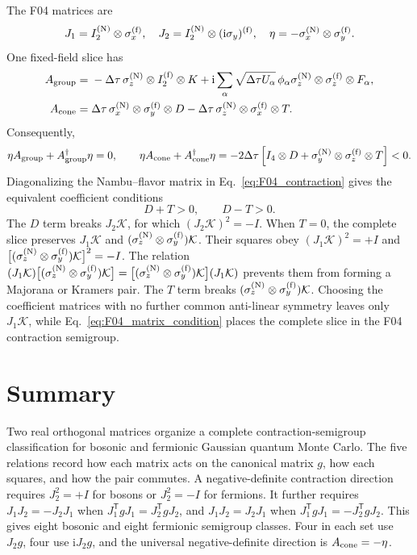 \documentclass[onecolumn,aps,prb,amsmath,amssymb,superscriptaddress,longbibliography,floatfix]{revtex4-2}
\newcommand{\ii}{\mathrm{i}}
\newcommand{\trans}{\mathsf{T}}
\newcommand{\mc}[1]{\mathcal{#1}}
\begin{document}
The F04 matrices are
\begin{equation}
J_1=I_2^{({\rm N})}\otimes\sigma_x^{({\rm f})},\quad
J_2=I_2^{({\rm N})}\otimes(\ii\sigma_y)^{({\rm f})},\quad
\eta=-\sigma_x^{({\rm N})}\otimes\sigma_y^{({\rm f})}.
\end{equation}
One fixed-field slice has
\begin{align}
A_{\rm group}={}&-\Delta\tau\,
\sigma_z^{({\rm N})}\otimes I_2^{({\rm f})}\otimes K
+\ii\sum_\alpha\sqrt{\Delta\tau U_\alpha}\,\phi_\alpha
\sigma_z^{({\rm N})}\otimes\sigma_z^{({\rm f})}\otimes F_\alpha,
\notag\\
A_{\rm cone}={}&\Delta\tau\,
\sigma_x^{({\rm N})}\otimes\sigma_y^{({\rm f})}\otimes D
-\Delta\tau\,\sigma_z^{({\rm N})}\otimes\sigma_x^{({\rm f})}\otimes T.
\label{eq:F04_slices}
\end{align}
Consequently,
\begin{equation}
\eta A_{\rm group}+A_{\rm group}^\dagger\eta=0,
\qquad
\eta A_{\rm cone}+A_{\rm cone}^\dagger\eta
=-2\Delta\tau\left[
I_4\otimes D
+\sigma_y^{({\rm N})}\otimes\sigma_z^{({\rm f})}\otimes T
\right]<0.
\label{eq:F04_contraction}
\end{equation}
Diagonalizing the Nambu--flavor matrix in Eq.~\eqref{eq:F04_contraction} gives the equivalent coefficient conditions
\begin{equation}
D+T>0,\qquad D-T>0.
\label{eq:F04_matrix_condition}
\end{equation}
The \(D\) term breaks \(J_2\mc K\), for which \((J_2\mc K)^2=-I\).  When \(T=0\), the complete slice preserves \(J_1\mc K\) and \((\sigma_z^{({\rm N})}\otimes\sigma_y^{({\rm f})})\mc K\).  Their squares obey \((J_1\mc K)^2=+I\) and \(\bigl[(\sigma_z^{({\rm N})}\otimes\sigma_y^{({\rm f})})\mc K\bigr]^2=-I\).  The relation \((J_1\mc K)\bigl[(\sigma_z^{({\rm N})}\otimes\sigma_y^{({\rm f})})\mc K\bigr]=\bigl[(\sigma_z^{({\rm N})}\otimes\sigma_y^{({\rm f})})\mc K\bigr](J_1\mc K)\) prevents them from forming a Majorana or Kramers pair.  The \(T\) term breaks \((\sigma_z^{({\rm N})}\otimes\sigma_y^{({\rm f})})\mc K\).  Choosing the coefficient matrices with no further common anti-linear symmetry leaves only \(J_1\mc K\), while Eq.~\eqref{eq:F04_matrix_condition} places the complete slice in the F04 contraction semigroup.

\section{Summary}

Two real orthogonal matrices organize a complete contraction-semigroup classification for bosonic and fermionic Gaussian quantum Monte Carlo.  The five relations record how each matrix acts on the canonical matrix \(g\), how each squares, and how the pair commutes.  A negative-definite contraction direction requires \(J_2^2=+I\) for bosons or \(J_2^2=-I\) for fermions.  It further requires \(J_1J_2=-J_2J_1\) when \(J_1^\trans gJ_1=J_2^\trans gJ_2\), and \(J_1J_2=J_2J_1\) when \(J_1^\trans gJ_1=-J_2^\trans gJ_2\).  This gives eight bosonic and eight fermionic semigroup classes.  Four in each set use \(J_2g\), four use \(\ii J_2g\), and the universal negative-definite direction is \(A_{\rm cone}=-\eta\).
\end{document}
